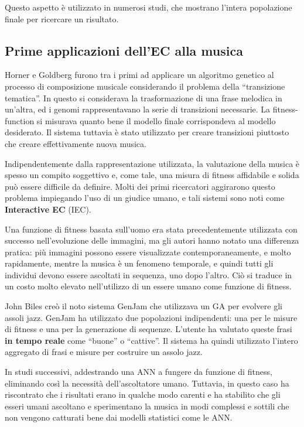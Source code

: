 \documentclass[a4paper,12pt]{report}
\begin{document}
Questo aspetto è utilizzato in numerosi studi, che mostrano l'intera popolazione finale per ricercare un risultato. 

\subsection{Prime applicazioni dell'EC alla musica}

Horner e Goldberg furono tra i primi ad applicare un algoritmo genetico al processo di composizione musicale considerando il problema della “transizione tematica”. 
In questo si considerava la trasformazione di una frase melodica in un'altra, ed i genomi rappresentavano la serie di transizioni necessarie. 
La fitness-function si misurava quanto bene il modello finale corrispondeva al modello desiderato. 
Il sistema tuttavia è stato utilizzato per creare transizioni piuttosto che creare effettivamente nuova musica. 

Indipendentemente dalla rappresentazione utilizzata, la valutazione della musica è spesso un compito soggettivo e, come tale, una misura di fitness affidabile e solida può essere difficile da definire. 
Molti dei primi ricercatori aggirarono questo problema impiegando l'uso di un giudice umano, e tali sistemi sono noti come \textbf{Interactive EC} (IEC). 

Una funzione di fitness basata sull’uomo era stata precedentemente utilizzata con successo nell’evoluzione delle immagini, ma gli autori hanno notato una differenza pratica: più immagini possono essere visualizzate contemporaneamente, e molto rapidamente, 
mentre la musica è un fenomeno temporale, e quindi tutti gli individui devono essere ascoltati in sequenza, uno dopo l'altro. 
Ciò si traduce in un costo molto elevato nell’utilizzo di un essere umano come funzione di fitness.

John Biles creò il noto sistema GenJam che utilizzava un GA per evolvere gli assoli jazz. 
GenJam ha utilizzato due popolazioni indipendenti: una per le misure di fitness e una per la generazione di sequenze. 
L’utente ha valutato queste frasi \textbf{in tempo reale} come “buone” o “cattive”. 
Il sistema ha quindi utilizzato l'intero aggregato di frasi e misure per costruire un assolo jazz. 

In studi successivi, addestrando una ANN a fungere da funzione di fitness, eliminando così la necessità dell'ascoltatore umano.
Tuttavia, in questo caso ha riscontrato che i risultati erano in qualche modo carenti e ha stabilito che gli esseri umani ascoltano e sperimentano la musica in modi complessi e sottili che non vengono catturati bene dai modelli statistici come le ANN. 
\end{document}
